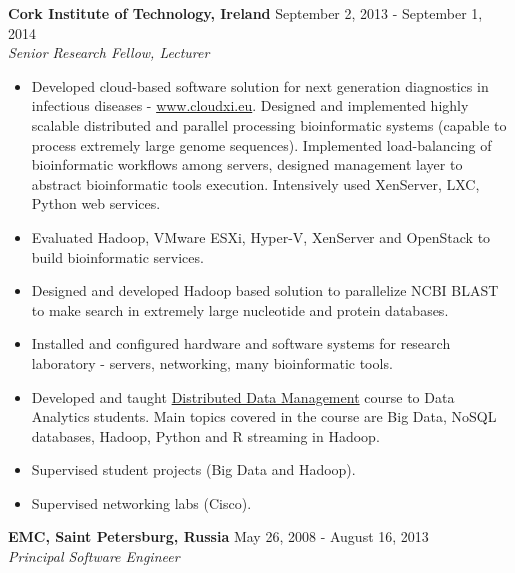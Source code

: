 \documentclass[a4paper,12pt,]{article}
\begin{document}
\begin{description}
  \item{\bfseries Cork Institute of Technology, Ireland} \hfill September 2, 2013 - September 1, 2014 \\
    {\em Senior Research Fellow, Lecturer}

    \begin{itemize}

    \item Developed cloud-based software solution for next generation diagnostics in infectious diseases - \url{www.cloudxi.eu}. Designed and implemented highly scalable distributed and parallel processing bioinformatic systems (capable to process extremely large genome sequences). Implemented load-balancing of bioinformatic workflows among servers, designed management layer to abstract bioinformatic tools execution. Intensively used XenServer, LXC, Python web services.

    \item Evaluated Hadoop, VMware ESXi, Hyper-V, XenServer and OpenStack to build bioinformatic services.

    \item Designed and developed Hadoop based solution to parallelize NCBI BLAST to make search in extremely large nucleotide and protein databases.

    \item Installed and configured hardware and software systems for research laboratory - servers, networking, many bioinformatic tools.

    \item Developed and taught \href{https://courses.cit.ie/index.cfm/page/module/moduleId/13651}{Distributed Data Management} course to Data Analytics students. Main topics covered in the course are Big Data, NoSQL databases, Hadoop, Python and R streaming in Hadoop.

    \item Supervised student projects (Big Data and Hadoop).

    \item Supervised networking labs (Cisco).

    \end{itemize}

  \item{\bfseries EMC, Saint Petersburg, Russia} \hfill  May 26, 2008 - August 16, 2013 \\
    {\em Principal Software Engineer}  

    \begin{itemize}


\end{itemize}
\end{description}
\end{document}

